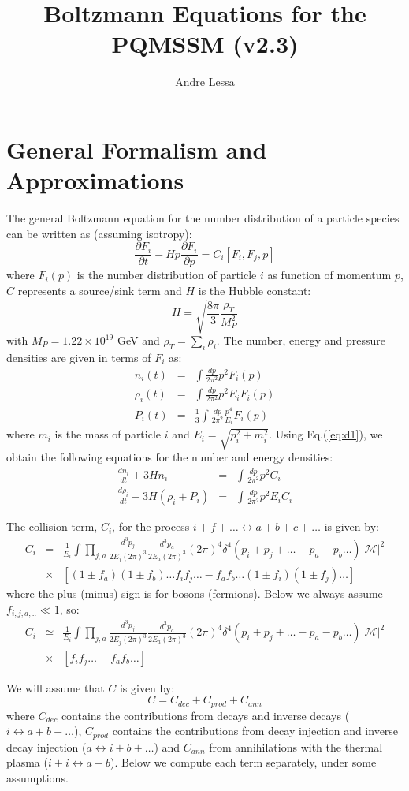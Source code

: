 \documentclass[preprint,notoc]{JHEP3}
\title{Boltzmann Equations for the PQMSSM (v2.3)}
\author{Andre Lessa}
\def\be{\begin{equation}}
\def\ee{\end{equation}}
\def\bea{\begin{eqnarray}}
\def\eea{\end{eqnarray}}
\newcommand\drv[2]{\frac{\partial #1}{\partial #2}}
\newcommand\Drv[2]{\frac{d #1}{d #2}}
\begin{document}
\section{General Formalism and Approximations}

The general Boltzmann equation for the number distribution of a particle species can be written as\cite{turner} (assuming isotropy):
\be
\drv{F_{i}}{t} -H p \drv{F_{i}}{p} = C_{i}[F_{i},F_{j},p] \label{eq:d1}
\ee
where $F_{i}(p)$ is the number distribution of particle $i$ as function of momentum $p$, $C$ represents a source/sink term and $H$ is the Hubble constant:
\be
H = \sqrt{\frac{8 \pi}{3} \frac{\rho_T}{M_P^2}} \label{H} 
\ee 
with $M_{P} = 1.22\times 10^{19}$ GeV and $\rho_T = \sum_{i} \rho_i$. The number, energy and pressure densities are given in terms
of $F_{i}$ as:
\bea
n_{i}(t) & = & \int \frac{dp}{2 \pi^2} p^2 F_i(p) \nonumber \\ 
\rho_{i}(t) & = & \int \frac{dp}{2 \pi^2} p^2 E_i F_i(p) \label{beqs}\\
P_{i}(t) & = & \frac{1}{3} \int \frac{dp}{2 \pi^2} \frac{p^4}{E_i} F_i(p) \nonumber
\eea
where $m_i$ is the mass of particle $i$ and $E_i = \sqrt{p_i^2 + m_i^2}$. Using Eq.(\ref{eq:d1}), we obtain the following equations for the number and energy densities:
\bea
\Drv{n_i}{t} + 3H n_i & = & \int \frac{dp}{2 \pi^2} p^2 C_i \nonumber \\
\Drv{\rho_i}{t} + 3H (\rho_i + P_i) & = & \int \frac{dp}{2 \pi^2} p^2 E_i C_i \label{eq:meqs}
\eea

The collision term, $C_i$, for the process $i + f + \ldots \leftrightarrow a
+ b + c + \ldots$ is given by\cite{kawasaki0}:
\bea
C_i & = & \frac{1}{E_i} \int \prod_{j,a} \frac{d^3 p_j}{2 E_j (2 \pi)^3}
\frac{d^3 p_a}{2 E_a (2 \pi)^3} (2 \pi)^4 \delta^{4}\left(p_i + p_j + \ldots - p_a - p_b
\ldots\right) |\mathcal{M}|^2 \nonumber \\
&\times& \left[(1 \pm f_a) (1 \pm
f_b)\ldots f_i f_j\ldots - f_a f_b \ldots (1 \pm f_i)(1 \pm f_j)\ldots \right]
\eea
where the plus (minus) sign is for bosons (fermions). Below we always assume
$f_{i,j,a,..} \ll 1$, so:
\bea
C_i & \simeq & \frac{1}{E_i} \int \prod_{j,a} \frac{d^3 p_j}{2 E_j (2 \pi)^3}
\frac{d^3 p_a}{2 E_a (2 \pi)^3} (2 \pi)^4 \delta^{4}\left(p_i + p_j + \ldots - p_a - p_b
\ldots\right) |\mathcal{M}|^2 \nonumber \\
&\times& \left[f_i f_j\ldots - f_a f_b \ldots \right]
\eea

We will assume that $C$ is given by:
\be
C = C_{dec} + C_{prod} + C_{ann} 
\ee
where $C_{dec}$ contains the contributions from decays and inverse decays
($i \leftrightarrow a + b + \ldots$), $C_{prod}$ contains the
contributions from decay injection and inverse decay injection 
($a \leftrightarrow i + b + \ldots$) and $C_{ann}$ from
annihilations with the thermal plasma ($i + i \leftrightarrow a + b$).
Below we compute each term separately, under some assumptions.
\end{document}
